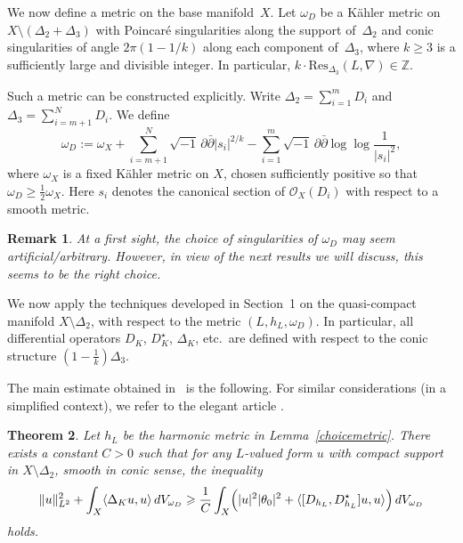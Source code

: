 \documentclass[english]{amsart}
\newcommand{\ddbar}{\partial\bar{\partial}}
\renewcommand{\geq}{\geqslant}
\newcommand{\Res}{\mathrm{Res}}
\newtheorem{thm}{Theorem}[section]
\newtheorem{remark}[thm]{Remark}
\numberwithin{equation}{thm}
\begin{document}
\medskip

We now define a metric on the base manifold~$X$.
Let $\omega_D$ be a Kähler metric on $X \setminus (\Delta_2 + \Delta_3)$ with
Poincaré singularities along the support of~$\Delta_2$ and conic singularities
of angle $2\pi(1-1/k)$ along each component of~$\Delta_3$, where
$k \geq 3$ is a sufficiently large and divisible integer.
In particular, $k \cdot \Res_{\Delta_3}(L,\nabla) \in \mathbb{Z}$.

Such a metric can be constructed explicitly.
Write $\Delta_2 = \sum_{i=1}^m D_i$ and $\Delta_3 = \sum_{i=m+1}^N D_i$.
We define
\begin{equation}\label{m1}
	\omega_D := \omega_X
	+ \sum_{i=m+1}^N \sqrt{-1}\,\ddbar |s_i|^{2/k}
	- \sum_{i=1}^m \sqrt{-1}\,\ddbar \log \log \frac{1}{|s_i|^2},
\end{equation}
where $\omega_X$ is a fixed Kähler metric on $X$, chosen sufficiently positive so that
$\omega_D \geq \frac{1}{2}\omega_X$.
Here $s_i$ denotes the canonical section of $\mathcal{O}_X(D_i)$ with respect to a smooth metric.

\begin{remark}
At a first sight, the choice of singularities of $\omega_D$ may seem artificial/arbitrary. However, in view of the next results we will discuss, this seems to be the right choice.
\end{remark}


\medskip

We now apply the techniques developed in Section~1 on the quasi-compact manifold
$X \setminus \Delta_2$, with respect to the metric $(L,h_L,\omega_D)$.
In particular, all differential operators
$D_K$, $D_K^\star$, $\Delta_K$, etc.\ are defined
with respect to the conic structure $(1-\frac{1}{k})\Delta_3$.
\medskip


The main estimate obtained in~\cite{CDHP} is the following. 
For similar considerations (in a simplified context), we refer to the elegant article \cite{Biq97}.

\begin{thm}\label{keyinequ}\cite[Thm 7.9]{CDHP}
Let $h_L$ be the harmonic metric in Lemma~\ref{choicemetric}.  There exists a constant $C>0$ such that for any
	$L$-valued form $u$ with compact support in $X\setminus \Delta_2$,
	smooth in conic sense, the inequality
	\begin{equation}\label{mainineq}
		\|u\|_{L^2}^2
		+ \int_X \langle \Delta_K u, u \rangle \, dV_{\omega_D}
		\geq \frac{1}{C}
		\int_X \Bigl(
		|u|^2 |\theta_0|^2
		+ \langle [D_{h_L}, D_{h_L}^\star] u, u \rangle
		\Bigr)\, dV_{\omega_D}
	\end{equation}
	holds.
\end{thm}
\end{document}

